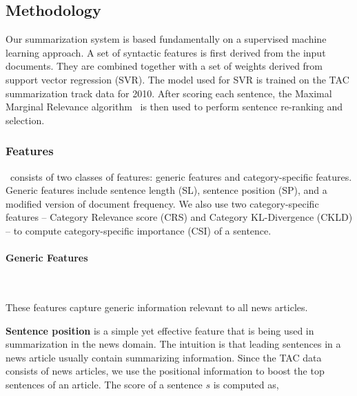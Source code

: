 \subsection{Methodology}

Our summarization system is based fundamentally on a supervised machine learning approach. A set of syntactic features is first derived from the input documents. They are combined together with a set of weights derived from support vector regression (SVR). The model used for SVR is trained on the TAC summarization track data for 2010. After scoring each sentence, the Maximal Marginal Relevance algorithm~\cite{carbonell1998use} is then used to perform sentence re-ranking and selection.


\subsubsection{Features}
\label{sysoverview:features}
\SWING\ consists of two classes of features: generic features and category-specific features. Generic features include sentence length (SL), sentence position (SP), and a modified version of document frequency. We also use two category-specific features -- Category Relevance score (CRS) and Category KL-Divergence (CKLD) -- to compute category-specific importance (CSI) of a sentence. 

\paragraph{Generic Features}\ \vspace{1mm}

These features capture generic information relevant to all news articles.\vspace{1mm}

\textbf{Sentence position} \cite{Edmundson:1969} is a simple yet effective feature that is being used in summarization in the news domain. The intuition is that leading sentences in a news article usually contain summarizing information. Since the TAC data consists of news articles, we use the positional information to boost the top sentences of an article. The score of a sentence $s$ is computed as,

